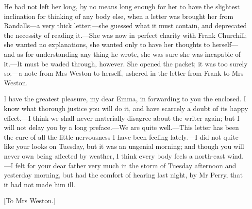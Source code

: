 He had not left her long, by no means long enough for her to have the slightest inclination for thinking of any body else, when a letter was brought her from Randalls—a very thick letter;—she guessed what it must contain, and deprecated the necessity of reading it.—She was now in perfect charity with Frank Churchill; she wanted no explanations, she wanted only to have her thoughts to herself—and as for understanding any thing he wrote, she was sure she was incapable of it.—It must be waded through, however. She opened the packet; it was too surely so;—a note from Mrs Weston to herself, ushered in the letter from Frank to Mrs Weston.

\begin{mail}{}{}
I have the greatest pleasure, my dear Emma, in forwarding to you the enclosed. I know what thorough justice you will do it, and have scarcely a doubt of its happy effect.—I think we shall never materially disagree about the writer again; but I will not delay you by a long preface.—We are quite well.—This letter has been the cure of all the little nervousness I have been feeling lately.—I did not quite like your looks on Tuesday, but it was an ungenial morning; and though you will never own being affected by weather, I think every body feels a north-east wind.—I felt for your dear father very much in the storm of Tuesday afternoon and yesterday morning, but had the comfort of hearing last night, by Mr Perry, that it had not made him ill.
\end{mail}

[To Mrs Weston.]


